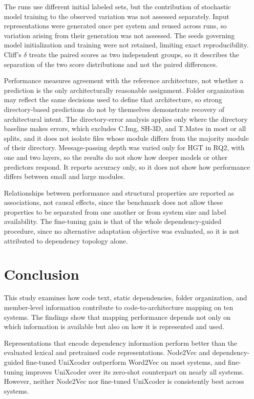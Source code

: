 The runs use different initial labeled sets, but the contribution of stochastic model training to the observed variation was not assessed separately. Input representations were generated once per system and reused across runs, so variation arising from their generation was not assessed. The seeds governing model initialization and training were not retained, limiting exact reproducibility. Cliff's $\delta$ treats the paired scores as two independent groups, so it describes the separation of the two score distributions and not the paired differences.

 Performance measures agreement with the reference architecture, not whether a prediction is the only architecturally reasonable assignment. Folder organization may reflect the same decisions used to define that architecture, so strong directory-based predictions do not by themselves demonstrate recovery of architectural intent. The directory-error analysis applies only where the directory baseline makes errors, which excludes C.Img, SH-3D, and T.Mates in most or all splits, and it does not isolate files whose module differs from the majority module of their directory.
Message-passing depth was varied only for HGT in RQ2, with one and two layers, so the results do not show how deeper models or other predictors respond. It reports accuracy only, so it does not show how performance differs between small and large modules.

Relationships between performance and structural properties are reported as associations, not causal effects, since the benchmark does not allow these properties to be separated from one another or from system size and label availability. The fine-tuning gain is that of the whole dependency-guided procedure, since no alternative adaptation objective was evaluated, so it is not attributed to dependency topology alone.

\section{Conclusion\label{sec:conclusion}}

This study examines how code text, static dependencies, folder organization, and member-level information contribute to code-to-architecture mapping on ten systems. The findings show that mapping performance depends not only on which information is available but also on how it is represented and used.

Representations that encode dependency information perform better than the evaluated lexical and pretrained code representations. Node2Vec and dependency-guided fine-tuned UniXcoder outperform Word2Vec on most systems, and fine-tuning improves UniXcoder over its zero-shot counterpart on nearly all systems. However, neither Node2Vec nor fine-tuned UniXcoder is consistently best across systems.

